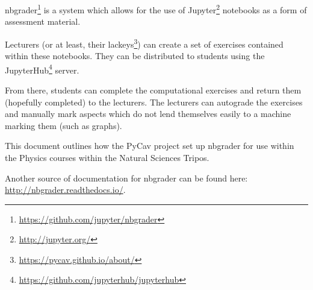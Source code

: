 nbgrader\footnote{\url{https://github.com/jupyter/nbgrader}} is a system which allows for the use of Jupyter\footnote{\url{http://jupyter.org/}} notebooks as a form of assessment material. 

Lecturers (or at least, their lackeys\footnote{\url{https://pycav.github.io/about/}}) can create a set of exercises contained within these notebooks. They can be distributed to students using the JupyterHub\footnote{\url{https://github.com/jupyterhub/jupyterhub}} server. 

From there, students can complete the computational exercises and return them (hopefully completed) to the lecturers. The lecturers can autograde the exercises and manually mark aspects which do not lend themselves easily to a machine marking them (such as graphs).

This document outlines how the PyCav project set up nbgrader for use within the Physics courses within the Natural Sciences Tripos.

Another source of documentation for nbgrader can be found here: \url{http://nbgrader.readthedocs.io/}.